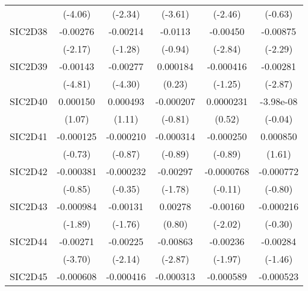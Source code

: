 \begin{table}[htbp]
\begin{tabular}{l*{5}{c}}
            &     (-4.06)         &     (-2.34)         &     (-3.61)         &     (-2.46)         &     (-0.63)         \\
SIC2D38     &    -0.00276\sym{*}  &    -0.00214         &     -0.0113         &    -0.00450\sym{**} &    -0.00875\sym{*}  \\
            &     (-2.17)         &     (-1.28)         &     (-0.94)         &     (-2.84)         &     (-2.29)         \\
SIC2D39     &    -0.00143\sym{***}&    -0.00277\sym{***}&    0.000184         &   -0.000416         &    -0.00281\sym{**} \\
            &     (-4.81)         &     (-4.30)         &      (0.23)         &     (-1.25)         &     (-2.87)         \\
SIC2D40     &    0.000150         &    0.000493         &   -0.000207         &   0.0000231         &   -3.98e-08         \\
            &      (1.07)         &      (1.11)         &     (-0.81)         &      (0.52)         &     (-0.04)         \\
SIC2D41     &   -0.000125         &   -0.000210         &   -0.000314         &   -0.000250         &    0.000850         \\
            &     (-0.73)         &     (-0.87)         &     (-0.89)         &     (-0.89)         &      (1.61)         \\
SIC2D42     &   -0.000381         &   -0.000232         &    -0.00297         &  -0.0000768         &   -0.000772         \\
            &     (-0.85)         &     (-0.35)         &     (-1.78)         &     (-0.11)         &     (-0.80)         \\
SIC2D43     &   -0.000984         &    -0.00131         &     0.00278         &    -0.00160\sym{*}  &   -0.000216         \\
            &     (-1.89)         &     (-1.76)         &      (0.80)         &     (-2.02)         &     (-0.30)         \\
SIC2D44     &    -0.00271\sym{***}&    -0.00225\sym{*}  &    -0.00863\sym{**} &    -0.00236\sym{*}  &    -0.00284         \\
            &     (-3.70)         &     (-2.14)         &     (-2.87)         &     (-1.97)         &     (-1.46)         \\
SIC2D45     &   -0.000608\sym{**} &   -0.000416         &   -0.000313         &   -0.000589         &   -0.000523         \\

\end{tabular}
\end{table}
